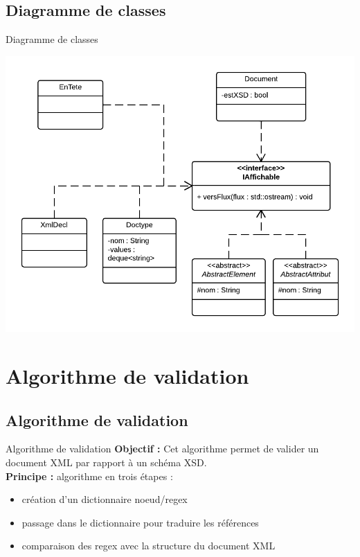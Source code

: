 \documentclass[aspectratio=169]{beamer}
\begin{document}
\subsection{Diagramme de classes}
\begin{frame}{Diagramme de classes}
\begin{center}
  \includegraphics[scale=0.3]{ddc_iaff}
\end{center}
\end{frame}


\section{Algorithme de  validation}
\subsection{Algorithme de  validation}
\begin{frame}[fragile]{Algorithme de validation}
	\textbf{Objectif :}
	Cet algorithme permet de valider un document XML par rapport à un schéma XSD. \\
	\textbf{Principe :} algorithme en trois étapes :
	\begin{itemize}
		\item création d'un dictionnaire noeud/regex
		\item passage dans le dictionnaire pour traduire les références
		\item comparaison des regex avec la structure du document XML
	\end{itemize}
\end{frame}
\end{document}
